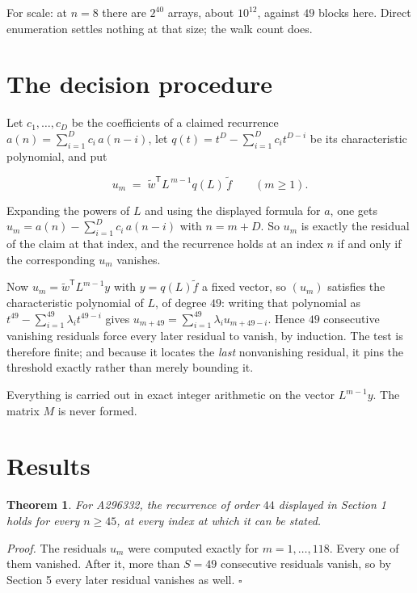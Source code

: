 \documentclass[11pt]{article}
\newtheorem{theorem}{Theorem}
\theoremstyle{definition}
\begin{document}
For scale: at $n = 8$ there are $2^{40}$ arrays, about $10^{12}$, against $49$ blocks here. Direct enumeration settles nothing at that size; the walk count does.

\section{The decision procedure}

Let $c_1,\dots,c_D$ be the coefficients of a claimed recurrence $a(n) = \sum_{i=1}^{D} c_i\,a(n-i)$, let $q(t) = t^{D} - \sum_{i=1}^{D} c_i t^{D-i}$ be its characteristic polynomial, and put

\[u_m \;=\; \tilde w^{\mathsf T} L^{\,m-1} q(L)\,\tilde f \qquad (m \ge 1).\]

Expanding the powers of $L$ and using the displayed formula for $a$, one gets $u_m = a(n) - \sum_{i=1}^{D} c_i\,a(n-i)$ with $n = m + D$. So $u_m$ is exactly the residual of the claim at that index, and the recurrence holds at an index $n$ if and only if the corresponding $u_m$ vanishes.

Now $u_m = \tilde w^{\mathsf T} L^{m-1} y$ with $y = q(L)\tilde f$ a fixed vector, so $(u_m)$ satisfies the characteristic polynomial of $L$, of degree $49$: writing that polynomial as $t^{49} - \sum_{i=1}^{49} \lambda_i t^{49-i}$ gives $u_{m+49} = \sum_{i=1}^{49} \lambda_i u_{m+49-i}$. Hence $49$ consecutive vanishing residuals force every later residual to vanish, by induction. The test is therefore finite; and because it locates the {\itshape last} nonvanishing residual, it pins the threshold exactly rather than merely bounding it.

Everything is carried out in exact integer arithmetic on the vector $L^{m-1}y$. The matrix $M$ is never formed.

\section{Results}

\begin{theorem} For A296332, the recurrence of order $44$ displayed in Section 1 holds for every $n \ge 45$, at every index at which it can be stated.\end{theorem}

{\itshape Proof.} The residuals $u_m$ were computed exactly for $m = 1,\dots,118$. Every one of them vanished. After it, more than $S = 49$ consecutive residuals vanish, so by Section 5 every later residual vanishes as well. $\square$
\end{document}
